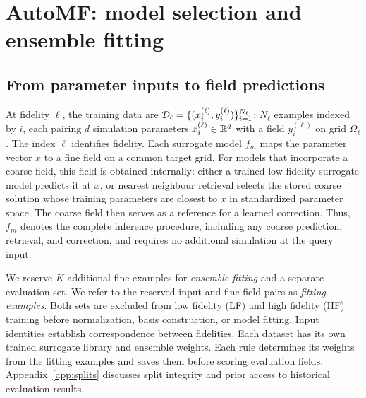 \section{AutoMF: model selection and ensemble fitting}
\label{sec:method}
\subsection{From parameter inputs to field predictions}
At fidelity $\ell$, the training data are
$\mathcal{D}_\ell=\{(x_i^{(\ell)},y_i^{(\ell)})\}_{i=1}^{N_\ell}$: $N_\ell$ examples
indexed by $i$, each pairing $d$ simulation parameters $x_i^{(\ell)}\in\mathbb{R}^d$
with a field $y_i^{(\ell)}$ on grid $\Omega_\ell$. The index $\ell$ identifies
fidelity. Each surrogate model $f_m$ maps the parameter vector $x$
to a fine field on a common target grid. For models that incorporate a coarse
field, this field is obtained internally: either a trained low fidelity
surrogate model predicts it at $x$, or nearest neighbour retrieval selects the stored
coarse solution whose training parameters are closest to $x$ in standardized
parameter space. The coarse field then serves as a reference for a learned
correction. Thus, $f_m$ denotes the complete inference procedure, including any
coarse prediction, retrieval, and correction, and requires no additional
simulation at the query input.

We reserve $K$ additional fine examples for \emph{ensemble fitting} and a separate evaluation set.
We refer to the reserved input and fine field pairs as \emph{fitting examples}.
Both sets are excluded from low fidelity (LF) and high fidelity (HF) training
before normalization, basis construction, or model fitting. Input identities
establish correspondence between fidelities. Each dataset has its own trained
surrogate library and ensemble weights. Each rule determines its weights from
the fitting examples and saves them before scoring evaluation fields.
Appendix~\ref{app:splits} discusses split integrity and prior access to
historical evaluation results.

